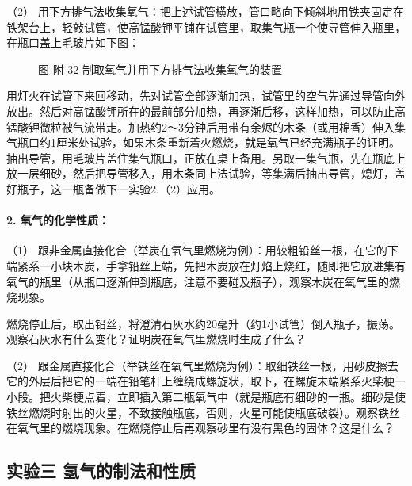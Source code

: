 （2）
用下方排气法收集氧气：把上述试管横放，管口略向下倾斜地用铁夹固定在铁架台上，轻敲试管，使高锰酸钾平铺在试管里，取集气瓶一个使导管伸入瓶里，在瓶口盖上毛玻片如下图：

\begin{figure}
\centering
\caption{图 附 32 制取氧气并用下方排气法收集氧气的装置}
\end{figure}

用灯火在试管下来回移动，先对试管全部逐渐加热，试管里的空气先通过导管向外放出。然后对高锰酸钾所在的最前部分加热，再逐渐后移，这样加热，可以防止高锰酸钾微粒被气流带走。加热约2～3分钟后用带有余烬的木条（或用棉香）伸入集气瓶口约1厘米处试验，如果木条重新着火燃烧，就是氧气已经充满瓶子的证明。抽出导管，用毛玻片盖住集气瓶口，正放在桌上备用。另取一集气瓶，先在瓶底上放一层细砂，然后把导管移入，用木条同上法试验，等集满后抽出导管，熄灯，盖好瓶子，这一瓶备做下一实验2.（2）应用。

\paragraph{2. 氧气的化学性质：}

（1）
跟非金属直接化合（举炭在氧气里燃烧为例）：用较粗铅丝一根，在它的下端紧系一小块木炭，手拿铅丝上端，先把木炭放在灯焰上烧红，随即把它放进集有氧气的瓶里（从瓶口逐渐伸到瓶底，注意不要碰及瓶子），观察木炭在氧气里的燃烧现象。

燃烧停止后，取出铅丝，将澄清石灰水约20毫升（约1小试管）倒入瓶子，振荡。观察石灰水有什么变化？证明炭在氧气里燃烧时生成了什么？

（2）
跟金属直接化合（举铁丝在氧气里燃烧为例）：取细铁丝一根，用砂皮擦去它的外层后把它的一端在铅笔杆上缠绕成螺旋状，取下，在螺旋末端紧系火柴梗一小段。把火柴梗点着，立即插入第二瓶氧气中（就是瓶底有细砂的一瓶。细砂是使铁丝燃烧时射出的火星，不致接触瓶底，否则，火星可能使瓶底破裂）。观察铁丝在氧气里的燃烧现象。在燃烧停止后再观察砂里有没有黑色的固体？这是什么？

\subsection{实验三 氢气的制法和性质}

